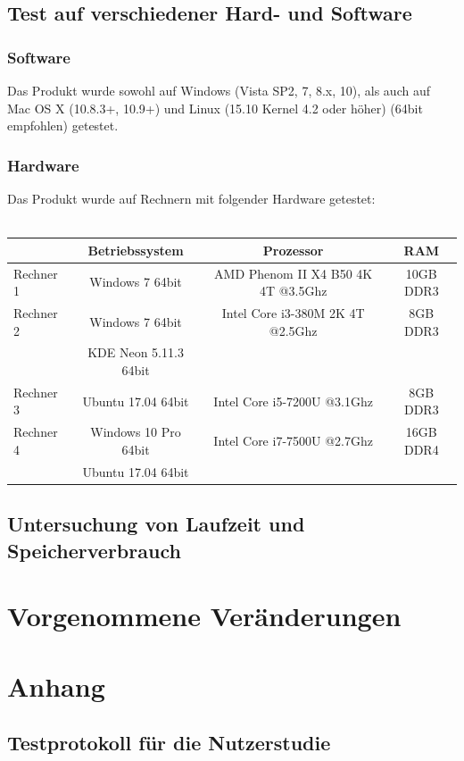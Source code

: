 \documentclass[parskip=full]{scrartcl}
\begin{document}
\subsection{Test auf verschiedener Hard- und Software}

\subsubsection{Software}
Das Produkt wurde sowohl auf Windows (Vista SP2, 7, 8.x, 10), als auch auf Mac OS X (10.8.3+, 10.9+) und Linux (15.10 Kernel 4.2 oder höher) (64bit empfohlen) getestet.

\subsubsection{Hardware}
Das Produkt wurde auf Rechnern mit folgender Hardware getestet: \\ \\
\begin{tabular}{l||c|c|c}
   	& Betriebssystem & Prozessor & RAM \\
	\hline
	\hline
	Rechner 1 & Windows 7 64bit & AMD Phenom II X4 B50 4K 4T @3.5Ghz & 10GB DDR3 \\
	Rechner 2 & Windows 7 64bit & Intel Core i3-380M 2K 4T @2.5Ghz & 8GB DDR3 \\
	 & KDE Neon 5.11.3 64bit &  \\
	Rechner 3 & Ubuntu 17.04 64bit & Intel Core i5-7200U @3.1Ghz & 8GB DDR3 \\
	Rechner 4 & Windows 10 Pro 64bit & Intel Core i7-7500U @2.7Ghz & 16GB DDR4\\
		& Ubuntu 17.04 64bit\\
\end{tabular}


\subsection{Untersuchung von Laufzeit und Speicherverbrauch}


\section{Vorgenommene Veränderungen}

\section{Anhang}
\subsection{Testprotokoll für die Nutzerstudie}
\end{document}

